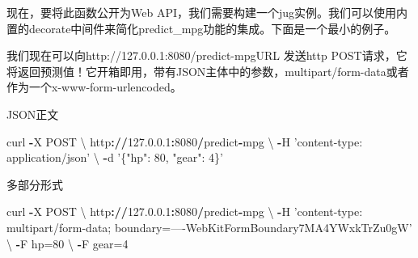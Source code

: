 \documentclass[]{book}
\newenvironment{Shaded}{\begin{snugshade}}{\end{snugshade}}
\newcommand{\KeywordTok}[1]{\textcolor[rgb]{0.13,0.29,0.53}{\textbf{#1}}}
\newcommand{\DecValTok}[1]{\textcolor[rgb]{0.00,0.00,0.81}{#1}}
\newcommand{\FloatTok}[1]{\textcolor[rgb]{0.00,0.00,0.81}{#1}}
\newcommand{\StringTok}[1]{\textcolor[rgb]{0.31,0.60,0.02}{#1}}
\newcommand{\OperatorTok}[1]{\textcolor[rgb]{0.81,0.36,0.00}{\textbf{#1}}}
\newcommand{\ErrorTok}[1]{\textcolor[rgb]{0.64,0.00,0.00}{\textbf{#1}}}
\newcommand{\NormalTok}[1]{#1}
\begin{document}
现在，要将此函数公开为Web
API，我们需要构建一个jug实例。我们可以使用内置的decorate中间件来简化predict\_mpg功能的集成。下面是一个最小的例子。

\begin{Shaded}
\end{Shaded}

我们现在可以向http://127.0.0.1:8080/predict-mpgURL 发送http
POST请求，它将返回预测值！它开箱即用，带有JSON主体中的参数，multipart/form-data或者作为一个x-www-form-urlencoded。

JSON正文

\begin{Shaded}
\begin{Highlighting}[]
\NormalTok{curl }\OperatorTok{-}\NormalTok{X POST \textbackslash{}}
\NormalTok{  http}\OperatorTok{:}\ErrorTok{//}\FloatTok{127.0}\NormalTok{.}\FloatTok{0.1}\OperatorTok{:}\DecValTok{8080}\OperatorTok{/}\NormalTok{predict}\OperatorTok{-}\NormalTok{mpg \textbackslash{}}
  \OperatorTok{-}\NormalTok{H }\StringTok{'content-type: application/json'}\NormalTok{ \textbackslash{}}
  \OperatorTok{-}\NormalTok{d }\StringTok{'\{"hp": 80, "gear": 4\}'}
\end{Highlighting}
\end{Shaded}

多部分形式

\begin{Shaded}
\begin{Highlighting}[]
\NormalTok{curl }\OperatorTok{-}\NormalTok{X POST \textbackslash{}}
\NormalTok{  http}\OperatorTok{:}\ErrorTok{//}\FloatTok{127.0}\NormalTok{.}\FloatTok{0.1}\OperatorTok{:}\DecValTok{8080}\OperatorTok{/}\NormalTok{predict}\OperatorTok{-}\NormalTok{mpg \textbackslash{}}
  \OperatorTok{-}\NormalTok{H }\StringTok{'content-type: multipart/form-data; boundary=----WebKitFormBoundary7MA4YWxkTrZu0gW'}\NormalTok{ \textbackslash{}}
  \OperatorTok{-}\NormalTok{F hp=}\DecValTok{80}\NormalTok{ \textbackslash{}}
  \OperatorTok{-}\NormalTok{F gear=}\DecValTok{4}
  
\end{Highlighting}
\end{Shaded}
\end{document}
